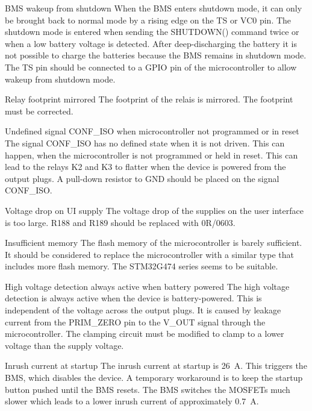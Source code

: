 \begin{ModTable}

\ModItemOpen
{\acs{BMS} wakeup from shutdown}
{When the \ac{BMS} enters shutdown mode, it can only be brought back to normal mode by a rising edge on the TS or VC0 pin. The shutdown mode is entered when sending the SHUTDOWN() command twice or when a low battery voltage is detected. After deep-discharging the battery it is not possible to charge the batteries because the \ac{BMS} remains in shutdown mode. }
{The TS pin should be connected to a GPIO pin of the microcontroller to allow wakeup from shutdown mode. }
{}
{}

\ModItemOpen
{Relay footprint mirrored}
{The footprint of the relais is mirrored. }
{The footprint must be corrected. }
{}
{}

\ModItemOpen
{Undefined signal CONF\_ISO when microcontroller not programmed or in reset}
{The signal CONF\_ISO has no defined state when it is not driven. This can happen, when the microcontroller is not programmed or held in reset. This can lead to the relays K2 and K3 to flatter when the device is powered from the output plugs. }
{A pull-down resistor to GND should be placed on the signal CONF\_ISO. }
{}
{}

\ModItemOpen
{Voltage drop on UI supply}
{The voltage drop of the supplies on the user interface is too large. }
{R188 and R189 should be replaced with 0R/0603. }
{}
{}

\ModItemOpen
{Insufficient memory}
{The flash memory of the microcontroller is barely sufficient. }
{It should be considered to replace the microcontroller with a similar type that includes more flash memory. The STM32G474 series seems to be suitable. }
{}
{}

\ModItemOpen
{High voltage detection always active when battery powered}
{The high voltage detection is always active when the device is battery-powered. This is independent of the voltage across the output plugs. It is caused by leakage current from the PRIM\_ZERO pin to the V\_OUT signal through the microcontroller. }
{The clamping circuit must be modified to clamp to a lower voltage than the supply voltage. }
{}
{}

\ModItemOpen
{Inrush current at startup}
{The inrush current at startup is \qty{26}{\ampere}. This triggers the \ac{BMS}, which disables the device. }
{A temporary workaround is to keep the startup button pushed until the \ac{BMS} resets. The \ac{BMS} switches the \acp{MOSFET} much slower which leads to a lower inrush current of approximately \qty{0.7}{\ampere}. }
{}
{}


\end{ModTable}
